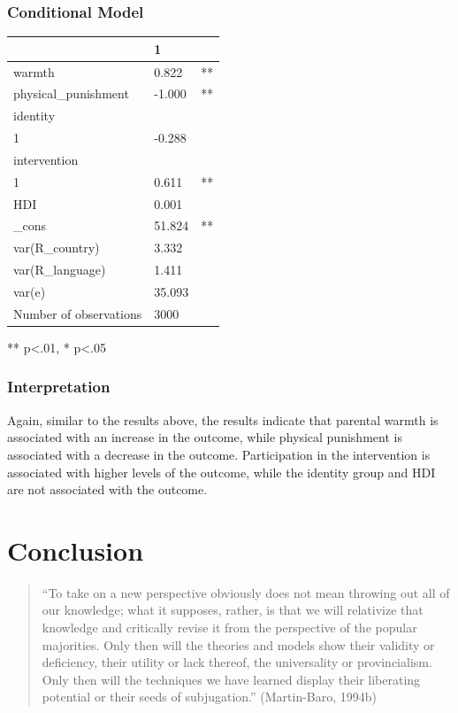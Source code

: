 \documentclass[
  letterpaper,
  DIV=11,
  numbers=noendperiod]{scrreprt}
\begin{document}
\subsection{Conditional Model}\label{conditional-model-1}

\begin{longtable}[]{@{}lll@{}}
\toprule\noalign{}
& 1 & \\
\midrule\noalign{}
\endhead
\bottomrule\noalign{}
\endlastfoot
warmth & 0.822 & ** \\
physical\_punishment & -1.000 & ** \\
identity & & \\
1 & -0.288 & \\
intervention & & \\
1 & 0.611 & ** \\
HDI & 0.001 & \\
\_cons & 51.824 & ** \\
var(R\_country) & 3.332 & \\
var(R\_language) & 1.411 & \\
var(e) & 35.093 & \\
Number of observations & 3000 & \\
\end{longtable}

** p\textless.01, * p\textless.05

\subsection{Interpretation}\label{interpretation-1}

Again, similar to the results above, the results indicate that parental
warmth is associated with an increase in the outcome, while physical
punishment is associated with a decrease in the outcome. Participation
in the intervention is associated with higher levels of the outcome,
while the identity group and HDI are not associated with the outcome.


\chapter{Conclusion}\label{conclusion}

\begin{quote}
``To take on a new perspective obviously does not mean throwing out all
of our knowledge; what it supposes, rather, is that we will relativize
that knowledge and critically revise it from the perspective of the
popular majorities. Only then will the theories and models show their
validity or deficiency, their utility or lack thereof, the universality
or provincialism. Only then will the techniques we have learned display
their liberating potential or their seeds of subjugation.''
(Martin-Baro, 1994b)  
\end{quote}
\end{document}
